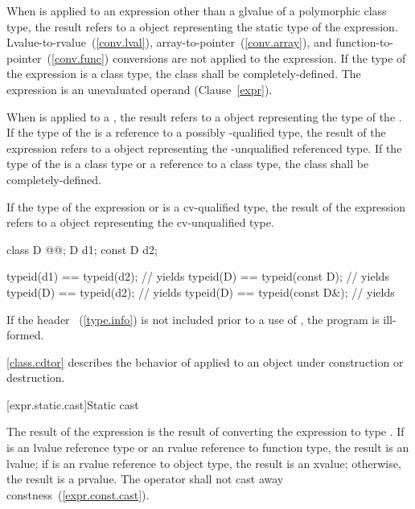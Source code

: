 \pnum
When  is applied to an expression other than a glvalue of
a polymorphic class type, the result refers to a 
object representing the static type of the expression.
Lvalue-to-rvalue~(\ref{conv.lval}), array-to-pointer~(\ref{conv.array}),
and function-to-pointer~(\ref{conv.func}) conversions are not applied to
the expression.
%
If the type of the expression is a class type, the class shall be
completely-defined. The expression is an unevaluated operand
(Clause~\ref{expr}).

\pnum
When  is applied to a , the result
refers to a  object representing the type of the
. If the type of the  is a reference
to a possibly -qualified type, the result of the
 expression refers to a  object
representing the -unqualified referenced type. If the type of
the  is a class type or a reference to a class type,
the class shall be completely-defined.

\pnum
If the type of the expression or  is a
cv-qualified type, the result of the  expression refers
to a  object representing the cv-unqualified
type.
\enterexample 

\begin{codeblock}
class D @@;
D d1;
const D d2;

typeid(d1) == typeid(d2);       // yields 
typeid(D)  == typeid(const D);  // yields 
typeid(D)  == typeid(d2);       // yields 
typeid(D)  == typeid(const D&); // yields 
\end{codeblock}
\exitexample 

\pnum
If the header ~(\ref{type.info}) is not included prior
to a use of , the program is ill-formed.

\pnum
\enternote
\ref{class.cdtor} describes the behavior of  applied to an
object under construction or destruction.
\exitnote 

[expr.static.cast]{Static cast}

\pnum
{}%
%
The result of the expression  is the result of
converting the expression  to type .
%
%
If  is an lvalue reference type
or an rvalue reference to function type, the result is an lvalue;
if  is an rvalue reference to object type, the result is an xvalue;
otherwise, the result is a prvalue. The  operator shall not cast
away constness~(\ref{expr.const.cast}).

